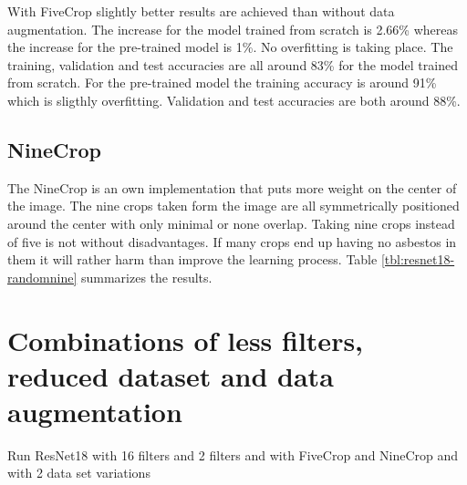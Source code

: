 With FiveCrop slightly better results are achieved than without data augmentation. The increase for the model trained from scratch is 2.66\% whereas the increase for the pre-trained model is 1\%. No overfitting is taking place. The training, validation and test accuracies are all around 83\% for the model trained from scratch. For the pre-trained model the training accuracy is around 91\% which is sligthly overfitting. Validation and test accuracies are both around 88\%.

\subsection{NineCrop}

The NineCrop is an own implementation that puts more weight on the center of the image. The nine crops taken form the image are all symmetrically positioned around the center with only minimal or none overlap. Taking nine crops instead of five is not without disadvantages. If many crops end up having no asbestos in them it will rather harm than improve the learning process. Table \ref{tbl:resnet18-randomnine} summarizes the results.

\begin{table}[h] \centering
{}
\caption{Resnet18 FiveCrop Implementation with and without pre-training. FINAL (regular) means ResNet18 with the resizing of the image instead of cropping and averaging}
\label{tbl:resnet18-randomnine}
\end{table}




\section{Combinations of less filters, reduced dataset and data augmentation}

Run ResNet18 with 16 filters and 2 filters and with FiveCrop and NineCrop and with 2 data set variations

